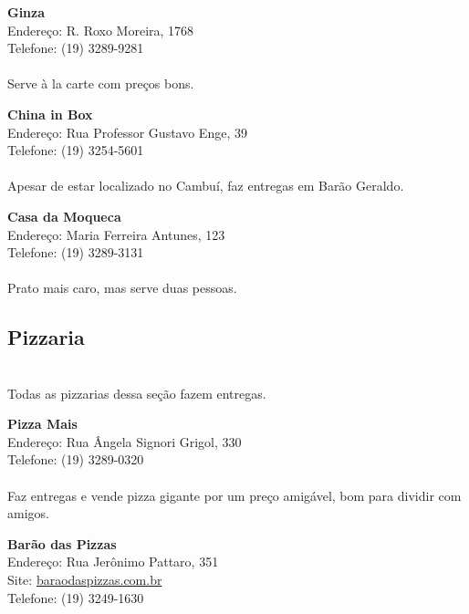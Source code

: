 \begin{itemsize}
\item \textbf{Ginza}
  \\Endereço: R. Roxo Moreira, 1768
  \\Telefone: (19) 3289-9281
  \\
  \\Serve à la carte com preços bons.
\end{itemsize}

\begin{itemsize}
\item \textbf{China in Box}
  \\Endereço: Rua Professor Gustavo Enge, 39
  \\Telefone: (19) 3254-5601
  \\
  \\Apesar de estar localizado no Cambuí, faz entregas em Barão Geraldo.
\end{itemsize}

\begin{itemsize}
\item \textbf{Casa da Moqueca}
  \\Endereço: Maria Ferreira Antunes, 123
  \\Telefone: (19) 3289-3131
  \\
  \\Prato mais caro, mas serve duas pessoas.
\end{itemsize}

\subsection{Pizzaria}

  \\Todas as pizzarias dessa seção fazem entregas.

\begin{itemsize}
\item \textbf{Pizza Mais}
  \\Endereço: Rua Ângela Signori Grigol, 330
  \\Telefone: (19) 3289-0320
  \\
  \\Faz entregas e vende pizza gigante por um preço amigável, bom para dividir
  com amigos.
\end{itemsize}

\begin{itemsize}
\item \textbf{Barão das Pizzas}
  \\Endereço: Rua Jerônimo Pattaro, 351
  \\Site: \url{baraodaspizzas.com.br}
  \\Telefone: (19) 3249-1630
  \\
\end{itemsize}

